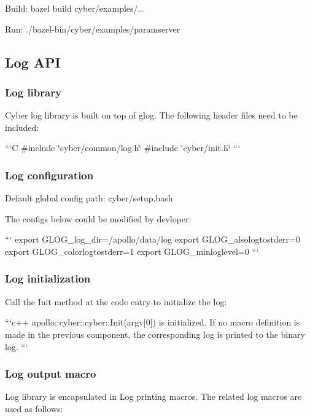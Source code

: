 \begin{DoxyItemize}
\item Build\-: bazel build cyber/examples/…
\item Run\-: ./bazel-\/bin/cyber/examples/paramserver
\end{DoxyItemize}

\subsection*{Log A\-P\-I}

\subsubsection*{Log library}

Cyber log library is built on top of glog. The following header files need to be included\-:

```\-C \#include \char`\"{}cyber/common/log.\-h\char`\"{} \#include \char`\"{}cyber/init.\-h\char`\"{} ```

\subsubsection*{Log configuration}

Default global config path\-: cyber/setup.\-bash

The configs below could be modified by devloper\-:

``` export G\-L\-O\-G\-\_\-log\-\_\-dir=/apollo/data/log export G\-L\-O\-G\-\_\-alsologtostderr=0 export G\-L\-O\-G\-\_\-colorlogtostderr=1 export G\-L\-O\-G\-\_\-minloglevel=0 ```

\subsubsection*{Log initialization}

Call the Init method at the code entry to initialize the log\-:

```c++ apollo\-::cyber\-::cyber\-::\-Init(argv\mbox{[}0\mbox{]}) is initialized. If no macro definition is made in the previous component, the corresponding log is printed to the binary log. ```

\subsubsection*{Log output macro}

Log library is encapsulated in Log printing macros. The related log macros are used as follows\-:

